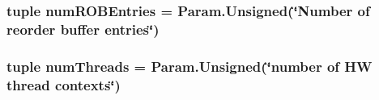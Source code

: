 \hypertarget{classSimpleOzoneCPU_1_1SimpleOzoneCPU_acb1025bcc322542b7e2fc418cd8d4308}{
\subsubsection[{numROBEntries}]{\setlength{\rightskip}{0pt plus 5cm}tuple {\bf numROBEntries} = Param.Unsigned(\char`\"{}Number of reorder buffer entries\char`\"{})}}
\label{classSimpleOzoneCPU_1_1SimpleOzoneCPU_acb1025bcc322542b7e2fc418cd8d4308}
\hypertarget{classSimpleOzoneCPU_1_1SimpleOzoneCPU_aac03a586f9fcb28bcbe8c3721888fa93}{
\subsubsection[{numThreads}]{\setlength{\rightskip}{0pt plus 5cm}tuple {\bf numThreads} = Param.Unsigned(\char`\"{}number of HW {\bf thread} contexts\char`\"{})}}
\label{classSimpleOzoneCPU_1_1SimpleOzoneCPU_aac03a586f9fcb28bcbe8c3721888fa93}


